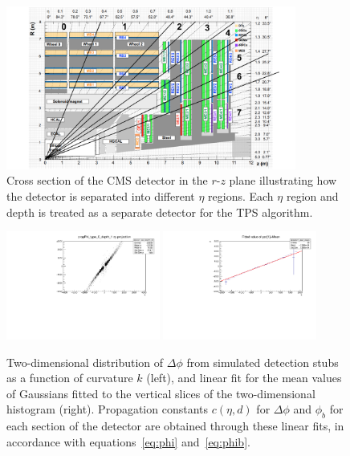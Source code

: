 \begin{figure}[htbp]
  \centering
  \includegraphics[width=0.85\textwidth]{fig/TPS/barrelEta.pdf}
  \caption{
    Cross section of the CMS detector in the $r$-$z$ plane illustrating how the detector is separated into different $\eta$ regions.
    Each $\eta$ region and depth is treated as a separate detector for the TPS algorithm.
  }
  \label{fig:barrelEta}
\end{figure}

\begin{figure}[htbp] %
  \centering
  \includegraphics[width=0.45\textwidth]{fig/TPS/deltaPhi_2D.pdf}
  \includegraphics[width=0.45\textwidth]{fig/TPS/deltaPhi_mean.pdf}\\
  \caption{
    Two-dimensional distribution of $\Delta\phi$ from simulated detection stubs as a function of curvature $k$ (left), and linear fit for the mean values of Gaussians fitted to the vertical slices of the two-dimensional histogram (right).
    Propagation constants $c(\eta,d)$ for $\Delta\phi$ and $\phi_b$ for each section of the detector are obtained through these linear fits, in accordance with equations~\ref{eq:phi} and~\ref{eq:phib}.
  }
  \label{fig:deltaPhiHist}
\end{figure}

